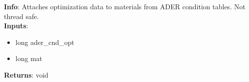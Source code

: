 \textbf{Info}: Attaches optimization data to materials from ADER condition
tables. Not thread safe. \\

\noindent \textbf{Inputs}:
\begin{itemize}
\item{long ader\_cnd\_opt}
\item{long mat}
\end{itemize}

\noindent \textbf{Returns}: void
